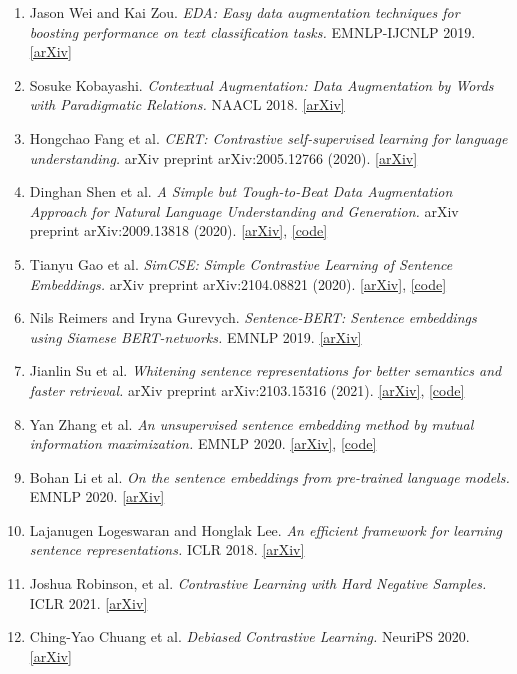 \documentclass[12pt]{article}
\begin{document}
\begin{enumerate}
    \item Jason Wei and Kai Zou. \textit{EDA: Easy data augmentation techniques for boosting performance on text classification tasks.}  EMNLP-IJCNLP 2019. \href{https://arxiv.org/abs/1901.11196}{[arXiv]}
    \item Sosuke Kobayashi. \textit{Contextual Augmentation: Data Augmentation by Words with Paradigmatic Relations.} NAACL 2018. \href{https://arxiv.org/abs/1805.06201}{[arXiv]}
    \item Hongchao Fang et al. \textit{CERT: Contrastive self-supervised learning for language understanding.} arXiv preprint arXiv:2005.12766 (2020). \href{https://arxiv.org/abs/2005.12766}{[arXiv]}
    \item Dinghan Shen et al. \textit{A Simple but Tough-to-Beat Data Augmentation Approach for Natural Language Understanding and Generation.} arXiv preprint arXiv:2009.13818 (2020). \href{https://arxiv.org/abs/2009.13818}{[arXiv]}, \href{https://github.com/dinghanshen/cutoff}{[code]}
    \item Tianyu Gao et al. \textit{SimCSE: Simple Contrastive Learning of Sentence Embeddings.} arXiv preprint arXiv:2104.08821 (2020). \href{https://arxiv.org/abs/2104.08821}{[arXiv]}, \href{https://github.com/princeton-nlp/SimCSE}{[code]}
    \item Nils Reimers and Iryna Gurevych. \textit{Sentence-BERT: Sentence embeddings using Siamese BERT-networks.} EMNLP 2019. \href{https://arxiv.org/abs/1908.10084}{[arXiv]}
    \item Jianlin Su et al. \textit{Whitening sentence representations for better semantics and faster retrieval.} arXiv preprint arXiv:2103.15316 (2021). \href{https://arxiv.org/abs/2103.15316}{[arXiv]}, \href{https://github.com/bojone/BERT-whitening}{[code]}
    \item Yan Zhang et al. \textit{An unsupervised sentence embedding method by mutual information maximization.} EMNLP 2020. \href{https://arxiv.org/abs/2009.12061}{[arXiv]}, \href{https://github.com/yanzhangnlp/IS-BERT}{[code]}
    \item Bohan Li et al. \textit{On the sentence embeddings from pre-trained language models.} EMNLP 2020. \href{https://arxiv.org/abs/2011.05864}{[arXiv]}
    \item Lajanugen Logeswaran and Honglak Lee. \textit{An efficient framework for learning sentence representations.} ICLR 2018. \href{https://arxiv.org/abs/1803.02893}{[arXiv]}
    \item Joshua Robinson, et al. \textit{Contrastive Learning with Hard Negative Samples.} ICLR 2021. \href{https://arxiv.org/abs/2010.04592}{[arXiv]}
    \item Ching-Yao Chuang et al. \textit{Debiased Contrastive Learning.} NeuriPS 2020. \href{https://arxiv.org/abs/2007.00224}{[arXiv]}
\end{enumerate}
\end{document}
